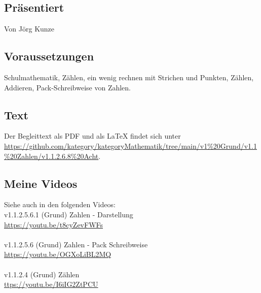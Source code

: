 \documentclass[a4paper]{amsart}
\theoremstyle{definition}
\begin{document}
\subsection*{Präsentiert}
Von Jörg Kunze

\subsection*{Voraussetzungen}
Schulmathematik, Zählen, ein wenig rechnen mit Strichen und Punkten, Zählen, Addieren, Pack-Schreibweise von Zahlen.

\subsection*{Text}
Der Begleittext als PDF und als LaTeX findet sich unter
\url{https://github.com/kategory/kategoryMathematik/tree/main/v1%20Grund/v1.1%20Zahlen/v1.1.2.6.8%20Acht}.

\subsection*{Meine Videos}
Siehe auch in den folgenden Videos:\\
v1.1.2.5.6.1 (Grund) Zahlen - Darstellung\\
\url{https://youtu.be/t8cyZevFWFs}\\
\\
v1.1.2.5.6 (Grund) Zahlen - Pack Schreibweise\\
\url{https://youtu.be/OGXoLiBL2MQ}\\
\\
v1.1.2.4 (Grund) Zählen\\
\url{ttps://youtu.be/I6iIG2ZtPCU}\\
\end{document}
